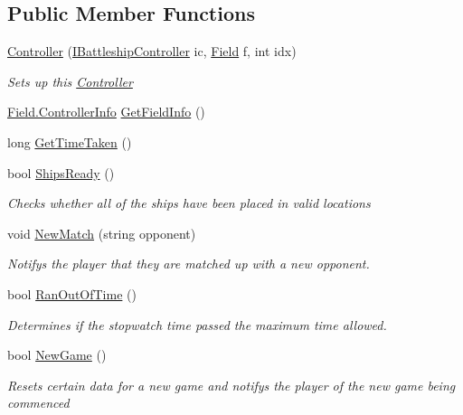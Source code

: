 \subsection*{Public Member Functions}
\begin{DoxyCompactItemize}
\item 
\hyperlink{class_m_b_c_1_1_core_1_1_controller_a22b24fb98efeba6e1bc7919a21428882}{Controller} (\hyperlink{interface_m_b_c_1_1_core_1_1_i_battleship_controller}{I\-Battleship\-Controller} ic, \hyperlink{class_m_b_c_1_1_core_1_1_field}{Field} f, int idx)
\begin{DoxyCompactList}\small\item\em Sets up this \hyperlink{class_m_b_c_1_1_core_1_1_controller}{Controller}\end{DoxyCompactList}\item 
\hyperlink{class_m_b_c_1_1_core_1_1_field_1_1_controller_info}{Field.\-Controller\-Info} \hyperlink{class_m_b_c_1_1_core_1_1_controller_af6f8a1a759c38557608ab0faebf49424}{Get\-Field\-Info} ()
\item 
long \hyperlink{class_m_b_c_1_1_core_1_1_controller_afdec43bffe7e30eb0e419c1db641a7f3}{Get\-Time\-Taken} ()
\item 
bool \hyperlink{class_m_b_c_1_1_core_1_1_controller_af4f0b5d25e8b772e7d333d06548d1f4b}{Ships\-Ready} ()
\begin{DoxyCompactList}\small\item\em Checks whether all of the ships have been placed in valid locations\end{DoxyCompactList}\item 
void \hyperlink{class_m_b_c_1_1_core_1_1_controller_a880c9ad7cd60528cad4f36da11bfd9bf}{New\-Match} (string opponent)
\begin{DoxyCompactList}\small\item\em Notifys the player that they are matched up with a new opponent.\end{DoxyCompactList}\item 
bool \hyperlink{class_m_b_c_1_1_core_1_1_controller_a6c4fc9aca31480cdfcbb3d4b1d0fd9e2}{Ran\-Out\-Of\-Time} ()
\begin{DoxyCompactList}\small\item\em Determines if the stopwatch time passed the maximum time allowed.\end{DoxyCompactList}\item 
bool \hyperlink{class_m_b_c_1_1_core_1_1_controller_ae87c31349a7fde4034942a1b505d372d}{New\-Game} ()
\begin{DoxyCompactList}\small\item\em Resets certain data for a new game and notifys the player of the new game being commenced\end{DoxyCompactList}\item 

\end{DoxyCompactItemize}

